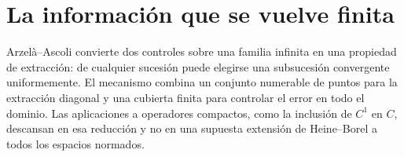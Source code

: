 \section{La información que se vuelve finita}
Arzelà--Ascoli convierte dos controles sobre una familia infinita en una propiedad de extracción: de cualquier sucesión puede elegirse una subsucesión convergente uniformemente. El mecanismo combina un conjunto numerable de puntos para la extracción diagonal y una cubierta finita para controlar el error en todo el dominio. Las aplicaciones a operadores compactos, como la inclusión de $C^1$ en $C$, descansan en esa reducción y no en una supuesta extensión de Heine--Borel a todos los espacios normados.
